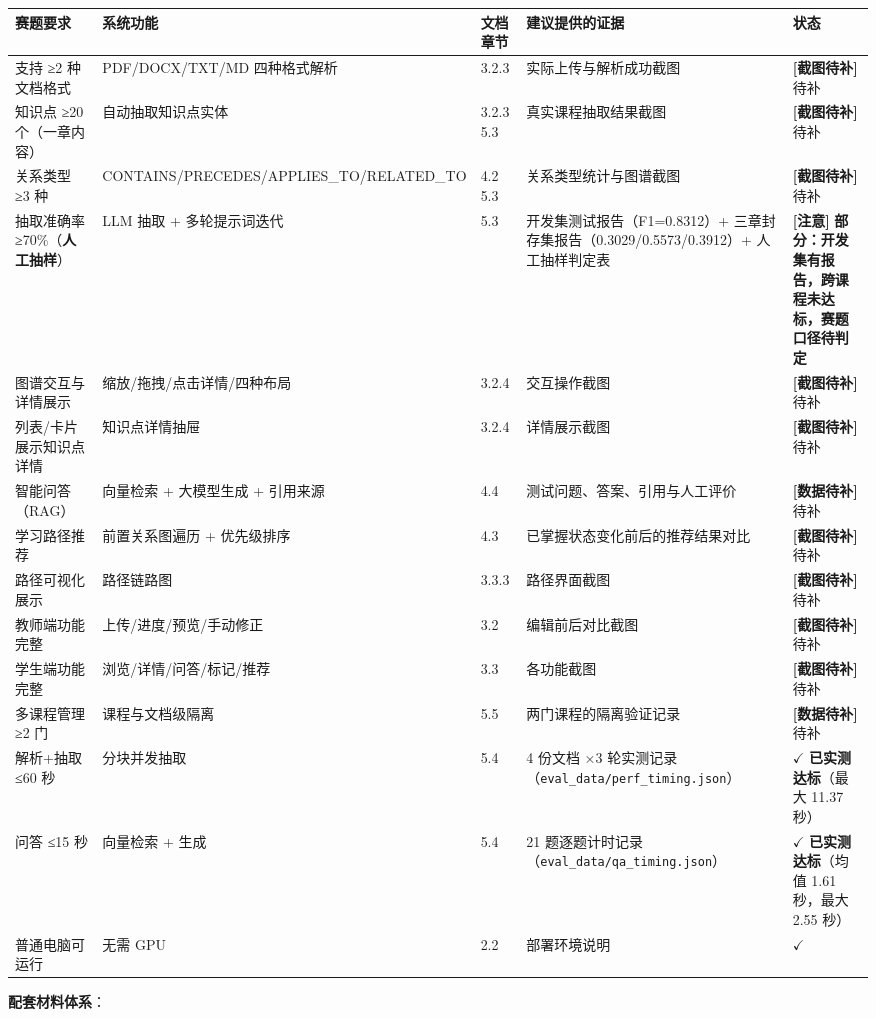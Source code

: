 \documentclass[UTF8,a4paper,11pt]{ctexrep}
\newcommand{\shotmark}{\textcolor{todobar}{\textbf{[截图待补]}}}
\newcommand{\todomark}{\textcolor{todobar}{\textbf{[数据待补]}}}
\newcommand{\warnmark}{\textcolor{todobar}{\textbf{[注意]}}}
\begin{document}
\begin{center}
\footnotesize
\begin{tabularx}{\linewidth}{@{}XXXXX@{}}
\toprule
赛题要求 & 系统功能 & 文档章节 & 建议提供的证据 & 状态 \\
\midrule
支持 ≥2 种文档格式 & PDF/DOCX/TXT/MD 四种格式解析 & 3.2.3 & 实际上传与解析成功截图 & \shotmark{} 待补 \\
知识点 ≥20 个（一章内容） & 自动抽取知识点实体 & 3.2.3 5.3 & 真实课程抽取结果截图 & \shotmark{} 待补 \\
关系类型 ≥3 种 & CONTAINS/PRECEDES/APPLIES\_TO/RELATED\_TO & 4.2 5.3 & 关系类型统计与图谱截图 & \shotmark{} 待补 \\
抽取准确率 ≥70\%（\textbf{人工抽样}） & LLM 抽取 + 多轮提示词迭代 & 5.3 & 开发集测试报告（F1=0.8312）+ 三章封存集报告（0.3029/0.5573/0.3912）+ 人工抽样判定表 & \warnmark{} \textbf{部分：开发集有报告，跨课程未达标，赛题口径待判定} \\
图谱交互与详情展示 & 缩放/拖拽/点击详情/四种布局 & 3.2.4 & 交互操作截图 & \shotmark{} 待补 \\
列表/卡片展示知识点详情 & 知识点详情抽屉 & 3.2.4 & 详情展示截图 & \shotmark{} 待补 \\
智能问答（RAG） & 向量检索 + 大模型生成 + 引用来源 & 4.4 & 测试问题、答案、引用与人工评价 & \todomark{} 待补 \\
学习路径推荐 & 前置关系图遍历 + 优先级排序 & 4.3 & 已掌握状态变化前后的推荐结果对比 & \shotmark{} 待补 \\
路径可视化展示 & 路径链路图 & 3.3.3 & 路径界面截图 & \shotmark{} 待补 \\
教师端功能完整 & 上传/进度/预览/手动修正 & 3.2 & 编辑前后对比截图 & \shotmark{} 待补 \\
学生端功能完整 & 浏览/详情/问答/标记/推荐 & 3.3 & 各功能截图 & \shotmark{} 待补 \\
多课程管理 ≥2 门 & 课程与文档级隔离 & 5.5 & 两门课程的隔离验证记录 & \todomark{} 待补 \\
解析+抽取 ≤60 秒 & 分块并发抽取 & 5.4 & 4 份文档 ×3 轮实测记录（\texttt{eval\_data/perf\_timing.json}） & $\checkmark$ \textbf{已实测达标}（最大 11.37 秒） \\
问答 ≤15 秒 & 向量检索 + 生成 & 5.4 & 21 题逐题计时记录（\texttt{eval\_data/qa\_timing.json}） & $\checkmark$ \textbf{已实测达标}（均值 1.61 秒，最大 2.55 秒） \\
普通电脑可运行 & 无需 GPU & 2.2 & 部署环境说明 & $\checkmark$ \\
\bottomrule
\end{tabularx}
\end{center}
\textbf{配套材料体系}：
\end{document}
